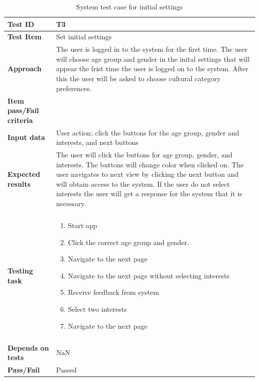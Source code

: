 \begin{appendices}
	\begin{table}[H]
		\centering
		\caption{System test case for initial settings}
		\begin{tabular}{ | l | l |}			
			\hline
			\textbf{Test ID} & T3  \\ \hline
			\textbf{Test Item} & Set initial settings \\ \hline
			\textbf{Approach} & \begin{minipage}{5in}The user is logged in to the system for the first time. The user will choose age group and gender in the inital settings that will appear the frist time the user is logged on to the system. After this the user will be asked to choose cultural category preferences.  \end{minipage}\\ \hline
			\textbf{Item pass/Fail criteria} & \\ \hline
			\textbf{Input data} & \begin{minipage}{5in} User action: click the buttons for the age group, gender and interests, and next buttons  \end{minipage}\\ \hline
			\textbf{Expected results} & \begin{minipage}{5in}The user will click the buttons for age group, gender, and interests. The buttons will change color when clicked on. The user navigates to next view by clicking the next button and will obtain access to the system. If the user do not select interests the user will get a response for the system that it is necessary. \end{minipage}\\ \hline&\\[-3.8ex]
			\textbf{Testing task} & \begin{minipage}{5in}
			\begin{enumerate}[noitemsep]
				\item Start app
				\item Click the correct age group and gender.
				\item Navigate to the next page
				\item Navigate to the next page without selecting interests
				\item Receive feedback from system
				\item Select two interests
				\item Navigate to the next page
			\end{enumerate}\end{minipage}
			\\ &\\[-3.8ex]\hline
			\textbf{Depends on tests} & NaN \\ \hline	
			\textbf{Pass/Fail} & Passed \\\hline				
		\end{tabular}
	\label{Tab:systemTesting3}
	\end{table}



\end{appendices}
